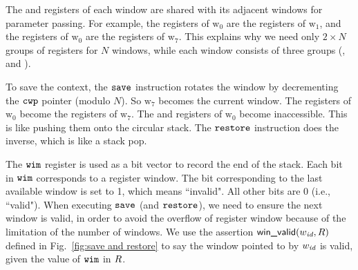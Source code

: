 The \inRN{} and \outRN{} registers of each window are shared
with its adjacent windows for parameter passing.
For example, the \inRN{} registers of $\text{w}_0$
are the \outRN{} registers of $\text{w}_1$,
and the \outRN{} registers of $\text{w}_0$
are the \inRN{} registers of $\text{w}_7$.
This explains
why we need only $2\times N$ groups of registers for
$N$ windows, while each window consists of
three groups (\outRN{}, \localRN{} and \inRN{}).

To save the context, the $\texttt{save}$ instruction
rotates the window by decrementing the $\texttt{cwp}$ pointer
(modulo $N$).
So $\text{w}_7$ becomes the current window. The \outRN{}
registers of $\text{w}_0$ become
the \inRN{} registers of $\text{w}_7$.
The \inRN{} and \localRN{} registers of $\text{w}_0$
become inaccessible.
This is like pushing them
onto the circular stack.
The $\texttt{restore}$ instruction does the inverse, which is like
a stack pop.

The $\texttt{wim}$ register is used as a bit vector to record the
end of the stack. Each bit in $\texttt{wim}$ corresponds to a
register window. The bit corresponding to the last available
window is set to 1, which means ``invalid". All other bits
are 0 (i.e., ``valid").
When executing $\texttt{save}$ (and $\texttt{restore}$), we need to ensure
the next window is valid, in order to avoid the overflow
of register window because of the limitation of the number
of windows. We use the assertion $\textsf{win\_valid}{(}w_{\textit{id}}, R)$ defined
in Fig.~\ref{fig:save and restore} to say the
window pointed to by $w_{\textit{id}}$ is valid, given the value of
$\texttt{wim}$ in $R$.

